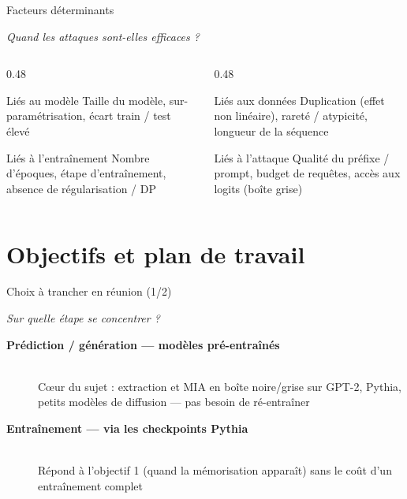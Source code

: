 \documentclass[aspectratio=169, 10pt, table]{beamer}
\newcommand{\subtitleline}[1]{{\small\itshape\color{TSPcyan}#1\par}\vspace{0.2cm}}
\begin{document}
\begin{frame}{Facteurs déterminants}
    \subtitleline{Quand les attaques sont-elles efficaces ?}
    
    \begin{columns}[T]
        \begin{column}{0.48\textwidth}
            \begin{block}{Liés au modèle}
                Taille du modèle, sur-paramétrisation, écart train / test élevé
            \end{block}
            \begin{block}{Liés à l'entraînement}
                Nombre d'époques, étape d'entraînement, absence de régularisation / DP
            \end{block}
        \end{column}
        \begin{column}{0.48\textwidth}
            \begin{block}{Liés aux données}
                Duplication (effet non linéaire), rareté / atypicité, longueur de la séquence
            \end{block}
            \begin{block}{Liés à l'attaque}
                Qualité du préfixe / prompt, budget de requêtes, accès aux logits (boîte grise)
            \end{block}
        \end{column}
    \end{columns}
\end{frame}

\section{Objectifs et plan de travail}

\begin{frame}{Choix à trancher en réunion (1/2)}
    \subtitleline{Sur quelle étape se concentrer ?}
    
    \begin{description}
        \item[\textbf{Prédiction / génération — modèles pré-entraînés}] \hfill \\
        Cœur du sujet : extraction et MIA en boîte noire/grise sur GPT-2, Pythia, petits modèles de diffusion — pas besoin de ré-entraîner
        \vspace{0.4cm}
        \item[\textbf{Entraînement — via les checkpoints Pythia}] \hfill \\
        Répond à l'objectif 1 (quand la mémorisation apparaît) sans le coût d'un entraînement complet
    \end{description}
\end{frame}
\end{document}
